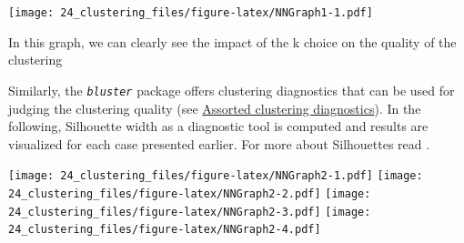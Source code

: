 \documentclass[
]{book}
\newenvironment{Shaded}{\begin{snugshade}}{\end{snugshade}}
\newcommand{\AttributeTok}[1]{\textcolor[rgb]{0.77,0.63,0.00}{#1}}
\newcommand{\CommentTok}[1]{\textcolor[rgb]{0.56,0.35,0.01}{\textit{#1}}}
\newcommand{\ControlFlowTok}[1]{\textcolor[rgb]{0.13,0.29,0.53}{\textbf{#1}}}
\newcommand{\FunctionTok}[1]{\textcolor[rgb]{0.00,0.00,0.00}{#1}}
\newcommand{\NormalTok}[1]{#1}
\newcommand{\OtherTok}[1]{\textcolor[rgb]{0.56,0.35,0.01}{#1}}
\newcommand{\SpecialCharTok}[1]{\textcolor[rgb]{0.00,0.00,0.00}{#1}}
\newcommand{\StringTok}[1]{\textcolor[rgb]{0.31,0.60,0.02}{#1}}
\begin{document}
\texttt{[image: 24\_clustering\_files/figure-latex/NNGraph1-1.pdf]}

In this graph, we can clearly see the impact of the k choice on the quality
of the clustering

Similarly, the \emph{\texttt{bluster}} \citep{R_bluster} package offers clustering
diagnostics that can be used for judging the clustering quality (see
\href{http://bioconductor.org/packages/release/bioc/vignettes/bluster/inst/doc/diagnostics.html}{Assorted clustering
diagnostics}).
In the following, Silhouette width as a diagnostic tool is computed
and results are visualized for each case presented earlier. For more
about Silhouettes read \citep{Rousseeuw1987}.

\begin{Shaded}
\end{Shaded}

\texttt{[image: 24\_clustering\_files/figure-latex/NNGraph2-1.pdf]} \texttt{[image: 24\_clustering\_files/figure-latex/NNGraph2-2.pdf]} \texttt{[image: 24\_clustering\_files/figure-latex/NNGraph2-3.pdf]} \texttt{[image: 24\_clustering\_files/figure-latex/NNGraph2-4.pdf]}
\end{document}
